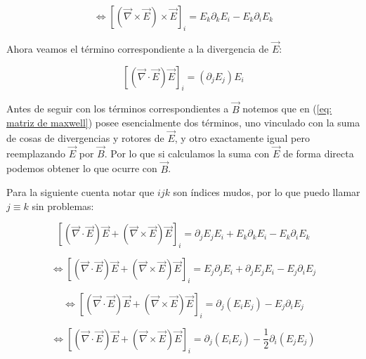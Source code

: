 \documentclass[]{article}
\begin{document}
\begin{equation}
    \Leftrightarrow
    \left[
    (\vec{\nabla} \times \vec{E}) \times \vec{E}
    \right]_i =
    E_k \partial_k E_i - E_k \partial_i E_k
    \label{eq: indice rotor de E}
\end{equation}

Ahora veamos el término correspondiente a la divergencia de $\vec{E}$:

\begin{equation}
    \left[ (\vec{\nabla} \cdot \vec{E}) \vec{E} \right]_i =
    (\partial_j E_j)E_i
    \label{eq: indice divergencia de E}
\end{equation}

Antes de seguir con los términos correspondientes a $\vec{B}$ notemos que en (\ref{eq: matriz de maxwell})
posee esencialmente dos términos, uno vinculado con la suma de cosas de divergencias y rotores de $\vec{E}$,
y otro exactamente igual pero reemplazando $\vec{E}$ por $\vec{B}$. Por lo que si calculamos la suma con $\vec{E}$
de forma directa podemos obtener lo que ocurre con $\vec{B}$.

Para la siguiente cuenta notar que $ijk$ son índices mudos, por lo que puedo llamar $j \equiv k$ sin problemas:

\begin{equation*}
    \left[
    (\vec{\nabla} \cdot \vec{E}) \vec{E} + (\vec{\nabla} \times \vec{E}) \vec{E}
    \right]_i =
    \partial_j E_j E_i + E_k \partial_k E_i - E_k \partial_i E_k
\end{equation*}

\begin{equation*}
    \Leftrightarrow
    \left[
    (\vec{\nabla} \cdot \vec{E}) \vec{E} + (\vec{\nabla} \times \vec{E}) \vec{E}
    \right]_i =
    E_j \partial_j E_i + \partial_j E_j E_i - E_j \partial_i E_j
\end{equation*}

\begin{equation*}
    \Leftrightarrow
    \left[
    (\vec{\nabla} \cdot \vec{E}) \vec{E} + (\vec{\nabla} \times \vec{E}) \vec{E}
    \right]_i =
    \partial_j (E_i E_j) - E_j \partial_i E_j
\end{equation*}

\begin{equation*}
    \Leftrightarrow
    \left[
    (\vec{\nabla} \cdot \vec{E}) \vec{E} + (\vec{\nabla} \times \vec{E}) \vec{E}
    \right]_i =
    \partial_j (E_i E_j) - \frac{1}{2} \partial_i (E_j E_j)
\end{equation*}
\end{document}
